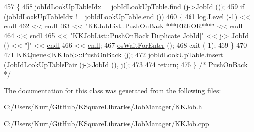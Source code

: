 \begin{DoxyCode}
457 \{
458   jobIdLookUpTableIdx = jobIdLookUpTable.find (j->\hyperlink{class_k_k_job_managment_1_1_k_k_job_a37a4f0f8bfafda64563f30034348e5f5}{JobId} ());
459   \textcolor{keywordflow}{if}  (jobIdLookUpTableIdx != jobIdLookUpTable.end ())
460   \{
461     log.\hyperlink{class_k_k_b_1_1_run_log_a32cf761d7f2e747465fd80533fdbb659}{Level} (-1) << \hyperlink{namespace_k_k_b_ad1f50f65af6adc8fa9e6f62d007818a8}{endl}
462                    << \hyperlink{namespace_k_k_b_ad1f50f65af6adc8fa9e6f62d007818a8}{endl}
463                    << \textcolor{stringliteral}{"KKJobList::PushOnBack      ***ERROR***"} << \hyperlink{namespace_k_k_b_ad1f50f65af6adc8fa9e6f62d007818a8}{endl} 
464                    << \hyperlink{namespace_k_k_b_ad1f50f65af6adc8fa9e6f62d007818a8}{endl} 
465                    << \textcolor{stringliteral}{"KKJobList::PushOnBack        Duplicate JobId["} << j->
      \hyperlink{class_k_k_job_managment_1_1_k_k_job_a37a4f0f8bfafda64563f30034348e5f5}{JobId} () << \textcolor{stringliteral}{"]"} << \hyperlink{namespace_k_k_b_ad1f50f65af6adc8fa9e6f62d007818a8}{endl}
466                    << \hyperlink{namespace_k_k_b_ad1f50f65af6adc8fa9e6f62d007818a8}{endl};
467     \hyperlink{namespace_k_k_b_a255aa69aade7f429585349d08973e09f}{osWaitForEnter} ();
468     exit (-1);
469   \}
470 
471   \hyperlink{class_k_k_b_1_1_k_k_queue}{KKQueue<KKJob>::PushOnBack} (j);
472   jobIdLookUpTable.insert (JobIdLookUpTablePair (j->\hyperlink{class_k_k_job_managment_1_1_k_k_job_a37a4f0f8bfafda64563f30034348e5f5}{JobId} (), j));
473 
474   \textcolor{keywordflow}{return};
475 \}  \textcolor{comment}{/* PushOnBack */}
\end{DoxyCode}


The documentation for this class was generated from the following files\+:\begin{DoxyCompactItemize}
\item 
C\+:/\+Users/\+Kurt/\+Git\+Hub/\+K\+Square\+Libraries/\+Job\+Manager/\hyperlink{_k_k_job_8h}{K\+K\+Job.\+h}\item 
C\+:/\+Users/\+Kurt/\+Git\+Hub/\+K\+Square\+Libraries/\+Job\+Manager/\hyperlink{_k_k_job_8cpp}{K\+K\+Job.\+cpp}\end{DoxyCompactItemize}
